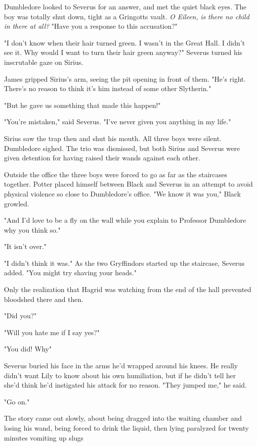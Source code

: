 Dumbledore looked to Severus for an answer, and met the quiet black eyes. The boy was totally shut down, tight as a Gringotts vault. \emph{O Eileen, is there no child in there at all?} "Have you a response to this accusation?"

"I don't know when their hair turned green. I wasn't in the Great Hall. I didn't see it. Why would I want to turn their hair green anyway?" Severus turned his inscrutable gaze on Sirius.

James gripped Sirius's arm, seeing the pit opening in front of them. "He's right. There's no reason to think it's him instead of some other Slytherin."

"But he gave us something that made this happen!"

"You're mistaken," said Severus. "I've never given you anything in my life."

Sirius saw the trap then and shut his mouth. All three boys were silent. Dumbledore sighed. The trio was dismissed, but both Sirius and Severus were given detention for having raised their wands against each other.

Outside the office the three boys were forced to go as far as the staircases together. Potter placed himself between Black and Severus in an attempt to avoid physical violence so close to Dumbledore's office. "We know it was you," Black growled.

"And I'd love to be a fly on the wall while you explain to Professor Dumbledore why you think so."

"It isn't over."

"I didn't think it was." As the two Gryffindors started up the staircase, Severus added. "You might try shaving your heads."

Only the realization that Hagrid was watching from the end of the hall prevented bloodshed there and then.

"Did you?"

"Will you hate me if I say yes?"

"You did! Why"

Severus buried his face in the arms he'd wrapped around his knees. He really didn't want Lily to know about his own humiliation, but if he didn't tell her she'd think he'd instigated his attack for no reason. "They jumped me," he said.

"Go on."

The story came out slowly, about being dragged into the waiting chamber and losing his wand, being forced to drink the liquid, then lying paralyzed for twenty minutes vomiting up slugs{\el}

